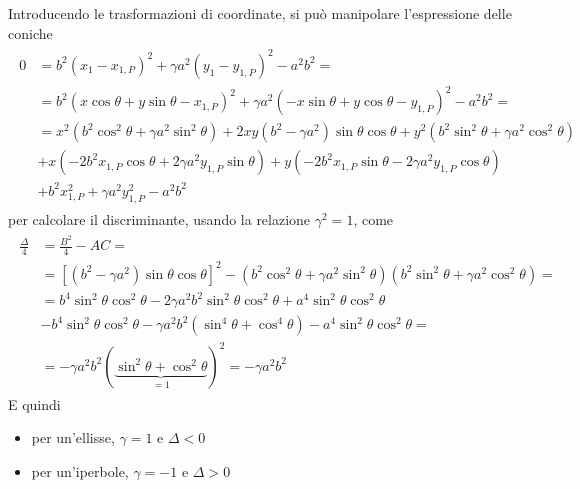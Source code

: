 \documentclass[letterpaper,10pt,italian]{jupyterBook}
\begin{document}
\sphinxAtStartPar
Introducendo le trasformazioni di coordinate, si può manipolare l’espressione delle coniche
\begin{equation*}
\begin{split}\begin{aligned}
  0 
  & = b^2 ( x_1 - x_{1,P} )^2 + \gamma a^2 ( y_1 - y_{1,P} )^2 - a^2 b^2 = \\
  & = b^2 ( x \cos \theta + y \sin \theta - x_{1,P} )^2 + \gamma a^2 ( - x \sin \theta + y \cos \theta - y_{1,P} )^2 - a^2 b^2 = \\
  & = x^2   \left( b^2 \cos^2 \theta + \gamma a^2 \sin^2 \theta \right)
    + 2 x y \left( b^2 - \gamma a^2 \right) \sin \theta \cos \theta 
    + y^2   \left( b^2 \sin^2 \theta + \gamma a^2 \cos^2 \theta \right) \\
  & + x     \left( - 2 b^2 x_{1,P} \cos \theta + 2 \gamma a^2 y_{1,P} \sin \theta \right) 
    + y     \left( - 2 b^2 x_{1,P} \sin \theta - 2 \gamma a^2 y_{1,P} \cos \theta \right) \\
  & + b^2 x_{1,P}^2 + \gamma a^2 y_{1,P}^2 - a^2 b^2 
\end{aligned}\end{split}
\end{equation*}
\sphinxAtStartPar
per calcolare il discriminante, usando la relazione \(\gamma^2 = 1\), come
\begin{equation*}
\begin{split}\begin{aligned}
  \frac{\Delta}{4}
  & = \frac{B^2}{4} - AC = \\
  & = \left[ \left( b^2 - \gamma a^2 \right) \sin \theta \cos \theta \right]^2 - \left( b^2 \cos^2 \theta + \gamma a^2 \sin^2 \theta \right) \left( b^2 \sin^2 \theta + \gamma a^2 \cos^2 \theta \right) = \\
  & = b^4 \sin^2 \theta \cos^2 \theta - 2 \gamma a^2 b^2 \sin^2 \theta \cos^2 \theta + a^4 \sin^2 \theta \cos^2 \theta \\
  & - b^4 \sin^2 \theta \cos^2 \theta - \gamma a^2 b^2 \left( \sin^4 \theta + \cos^4 \theta \right) - a^4 \sin^2 \theta \cos^2 \theta = \\
  & = - \gamma a^2 b^2 \left(\underbrace{ \sin^2 \theta + \cos^2 \theta}_{=1} \right)^2 = - \gamma a^2 b^2
\end{aligned}\end{split}
\end{equation*}
\sphinxAtStartPar
E quindi
\begin{itemize}
\item {} 
\sphinxAtStartPar
per un’ellisse, \(\gamma = 1\) e \(\Delta < 0\)

\item {} 
\sphinxAtStartPar
per un’iperbole, \(\gamma =-1\) e \(\Delta > 0\)

\end{itemize}
\end{document}
